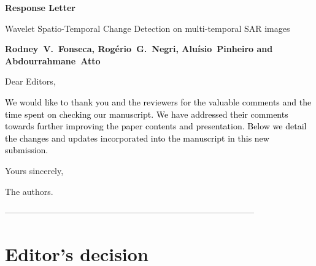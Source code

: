 \documentclass[11pt]{report}
\begin{document}
\begin{center}
\large{\textbf{Response Letter}}

\vglue 0.3cm

\huge{Wavelet Spatio-Temporal Change Detection on multi-temporal SAR images}
\end{center}

\begin{center}
\textbf{Rodney~V.~Fonseca, Rog\'{e}rio~G.~Negri, Alu\'{i}sio~Pinheiro and Abdourrahmane~Atto}
\end{center}

\date{\today}


\vspace{2cm}
\noindent Dear Editors,
\bigskip

\textcolor{black}{We would like to thank you and the reviewers for the valuable comments and the time spent on checking our manuscript. 
We have addressed their comments towards further improving the paper contents and presentation. 
Below we detail the changes and updates incorporated into the manuscript in this new submission.}


\medskip
\noindent Yours sincerely,

\begin{flushright}
\noindent The authors.
\end{flushright}




\noindent---------------------------------------------------------------------------------------
\section*{Editor's decision}
\end{document}
